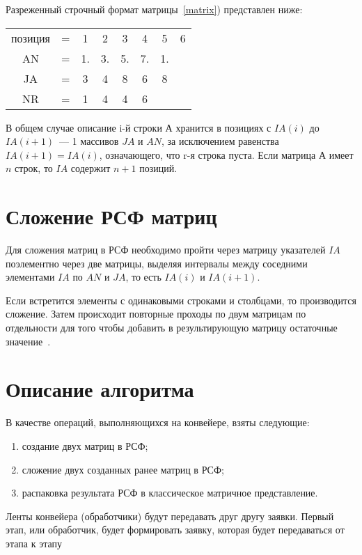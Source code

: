 Разреженный строчный формат матрицы~\ref{matrix}) представлен ниже:
\begin{table}[h!]
	\begin{center}
		\begin{tabular}{c c c c c c c c}
			позиция & = & 1 & 2 & 3 & 4 & 5 & 6 \\
			AN & = & 1. & 3. & 5. & 7. & 1. & \\
			JA & = & 3 & 4 & 8 & 6 & 8 & \\
			NR & = & 1 & 4 & 4 & 6 & & \\
		\end{tabular}
	\end{center}
\end{table}

В общем случае описание i-й строки $А$ хранится в позициях с $IA(i)$ до $IA(i + 1)$~--- 1 массивов $JA$ и $AN$, за исключением равенства $IA(i + 1) = IA(i)$, означающего, что r-я строка пуста. Если матрица $А$ имеет $n$ строк, то $IA$ содержит $n + 1$ позиций. 
		
\section{Сложение РСФ матриц}
Для сложения матриц в РСФ необходимо пройти через матрицу указателей $IA$ поэлементно через две матрицы, выделяя интервалы между соседними элементами $IA$ по $AN$ и $JA$, то есть $IA(i)$ и $IA(i + 1)$.

Если встретится элементы с одинаковыми строками и столбцами, то производится сложение. Затем происходит повторные проходы по двум матрицам  по отдельности для того чтобы добавить в результирующую матрицу остаточные значение~\cite{csr}.

\section{Описание алгоритма}
В качестве операций, выполняющихся на конвейере, взяты следующие:
\begin{enumerate}
	\item создание двух матриц в РСФ;
	\item сложение двух созданных ранее матриц в РСФ;
	\item распаковка результата РСФ в классическое матричное представление.
\end{enumerate}

Ленты конвейера (обработчики) будут передавать друг другу заявки. Первый этап, или обработчик, будет формировать заявку, которая будет передаваться от этапа к этапу

